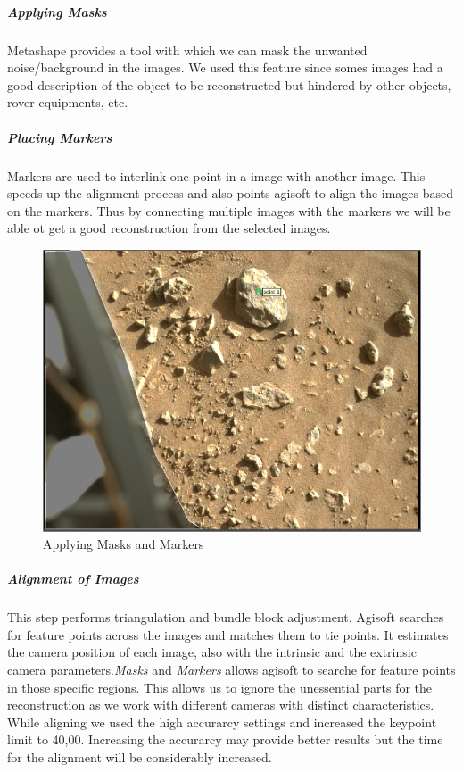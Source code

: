 \subparagraph{Applying Masks}
\label{applyingMasks}

Metashape provides a tool with which we can mask the unwanted noise/background in the images. We used this feature since somes images had a good description of the object to be reconstructed but hindered by other objects, rover equipments, etc. 

\subparagraph{Placing Markers}
\label{placingMarkers}

Markers are used to interlink one point in a image with another image. This speeds up the alignment process and also points agisoft to align the images based on the markers. Thus by connecting multiple images with the markers we will be able ot get a good reconstruction from the selected images.

\begin{figure}[H]
	\centering
	\includegraphics[scale=0.3]{img/masksandMarkers.png}
	\caption{Applying Masks and Markers}
	\label{fig:masksMarkers}
\end{figure}
\subparagraph{Alignment of Images}
\label{alignmentOfImages}
This step performs triangulation and bundle block adjustment. Agisoft searches for feature points across the images and matches them to tie points. It estimates the camera position of each image, also with the intrinsic and the extrinsic camera parameters.\emph{Masks} and \emph{Markers} allows agisoft to searche for feature points in those specific regions. This allows us to ignore the unessential parts for the reconstruction as we work with different cameras with distinct characteristics. While aligning we used the high accurarcy settings and increased the keypoint limit to 40,00. Increasing the accurarcy may provide better results but the time for the alignment will be considerably increased.

